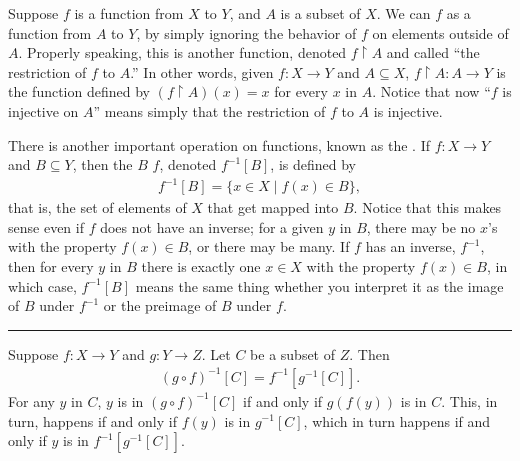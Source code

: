\documentclass[letterpaper,10pt,english]{sphinxmanual}
\begin{document}
\sphinxAtStartPar
Suppose \(f\) is a function from \(X\) to \(Y\), and \(A\) is a subset of \(X\). We can  \(f\) as a function from \(A\) to \(Y\), by simply ignoring the behavior of \(f\) on elements outside of \(A\). Properly speaking, this is another function, denoted \(f \upharpoonright A\) and called “the restriction of \(f\) to \(A\).” In other words, given \(f : X \to Y\) and \(A \subseteq X\), \(f \upharpoonright A : A \to Y\) is the function defined by \((f \upharpoonright A)(x) = x\) for every \(x\) in \(A\). Notice that now “\(f\) is injective on \(A\)” means simply that the restriction of \(f\) to \(A\) is injective.

\sphinxAtStartPar
There is another important operation on functions, known as the . If \(f : X \to Y\) and \(B \subseteq Y\), then the  \(B\)  \(f\), denoted \(f^{-1}[B]\), is defined by
\begin{equation*}
\begin{split}f^{-1}[B] = \{ x \in X \mid f(x) \in B \},\end{split}
\end{equation*}
\sphinxAtStartPar
that is, the set of elements of \(X\) that get mapped into \(B\). Notice that this makes sense even if \(f\) does not have an inverse; for a given \(y\) in \(B\), there may be no \(x\)’s with the property \(f(x) \in B\), or there may be many. If \(f\) has an inverse, \(f^{-1}\), then for every \(y\) in \(B\) there is exactly one \(x \in X\) with the property \(f(x) \in B\), in which case, \(f^{-1}[B]\) means the same thing whether you interpret it as the image of \(B\) under \(f^{-1}\) or the preimage of \(B\) under \(f\).


\bigskip\hrule\bigskip


\sphinxAtStartPar
{} Suppose \(f : X \to Y\) and \(g : Y \to Z\). Let \(C\) be a subset of \(Z\). Then
\begin{equation*}
\begin{split}(g \circ f)^{-1}[C] = f^{-1}[g^{-1}[C]].\end{split}
\end{equation*}
\sphinxAtStartPar
{} For any \(y\) in \(C\), \(y\) is in \((g \circ f)^{-1}[C]\) if and only if \(g(f(y))\) is in \(C\). This, in turn, happens if and only if \(f(y)\) is in \(g^{-1}[C]\), which in turn happens if and only if \(y\) is in \(f^{-1}[g^{-1}[C]]\).
\end{document}
